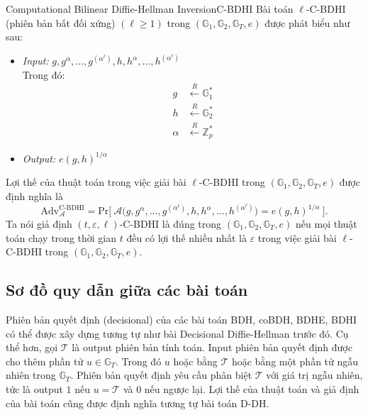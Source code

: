 \documentclass[class=report, crop=false]{standalone}
\begin{document}
			\begin{problem}{Computational Bilinear Diffie-Hellman Inversion}{C-BDHI}
				Bài toán $\ell$-C-BDHI (phiên bản bất đối xứng) $(\ell \geq 1)$ trong $(\mathbb{G}_1, \mathbb{G}_2, \mathbb{G}_T, e)$ được phát biểu như sau:
				\vspace{-\baselineskip}
				\begin{itemize}[leftmargin=1.5cm, itemindent=-0.5cm]
					\item[] \textit{Input:} $g, g^\alpha, ..., g^{(\alpha^\ell)}, h, h^\alpha, ..., h^{(\alpha^\ell)}$ \\
					Trong đó: \vspace{-\baselineskip}
					\begin{align*}
						g 		&\xleftarrow{R} \mathbb{G}_1^* \\
						h 		&\xleftarrow{R} \mathbb{G}_2^* \\
						\alpha 	&\xleftarrow{R} \mathbb{Z}_p^*
					\end{align*}
					\item[] \textit{Output:} $e(g, h)^{1/\alpha}$
				\end{itemize}
				\vspace{-\baselineskip}\par
				Lợi thế của thuật toán \algo trong việc giải bài $\ell$-C-BDHI trong $(\mathbb{G}_1, \mathbb{G}_2, \mathbb{G}_T, e)$ được định nghĩa là
				\[
					\text{Adv}_{\mathcal{A}}^{\text{C-BDHI}} = \text{Pr}\bigg[ \ \mathcal{A}\Big(g, g^\alpha, ..., g^{(\alpha^\ell)}, h, h^\alpha, ..., h^{(\alpha^\ell)} \Big) = e(g, h)^{1/\alpha} \ \bigg].
				\] \indent
				Ta nói giả định $(t, \varepsilon, \ell)$-C-BDHI là đúng trong $(\mathbb{G}_1, \mathbb{G}_2, \mathbb{G}_T, e)$ nếu mọi thuật toán chạy trong thời gian $t$ đều có lợi thế nhiều nhất là $\varepsilon$ trong việc giải bài $\ell$-C-BDHI trong $(\mathbb{G}_1, \mathbb{G}_2, \mathbb{G}_T, e)$.
			\end{problem}
		\subsection{Sơ đồ quy dẫn giữa các bài toán}
			Phiên bản quyết định (decisional) của các bài toán BDH, coBDH, BDHE, BDHI có thể được xây dựng tương tự như bài Decisional Diffie-Hellman trước đó. Cụ thể hơn, gọi $\mathcal{T}$ là output phiên bản tính toán. Input phiên bản quyết định được cho thêm phần tử $u \in \mathbb{G}_T$. Trong đó $u$ hoặc bằng $\mathcal{T}$ hoặc bằng một phần tử ngẫu nhiên trong $\mathbb{G}_T$. Phiên bản quyết định yêu cầu phân biệt $\mathcal{T}$ với giá trị ngẫu nhiên, tức là output $1$ nếu $u = \mathcal{T}$ và $0$ nếu ngược lại. Lợi thế của thuật toán và giả định của bài toán cũng được định nghĩa tương tự bài toán D-DH.
		
\end{document}
